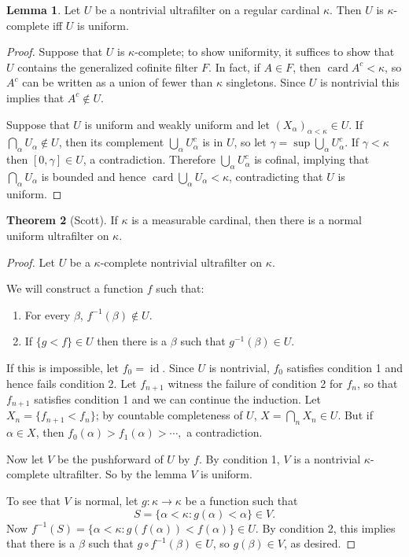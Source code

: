 \documentclass[12pt]{report}
\newcommand{\card}{\operatorname{card}}
\newcommand{\id}{\operatorname{id}}
\theoremstyle{definition}
\newtheorem{theorem}{Theorem}[chapter]
\newtheorem{lemma}[theorem]{Lemma}
\begin{document}
\begin{lemma}
Let $U$ be a nontrivial ultrafilter on a regular cardinal $\kappa$. Then $U$ is $\kappa$-complete iff $U$ is uniform.
\end{lemma}
\begin{proof}
Suppose that $U$ is $\kappa$-complete; to show uniformity, it suffices to show that $U$ contains the generalized cofinite filter $F$. In fact, if $A \in F$, then $\card A^c < \kappa$, so $A^c$ can be written as a union of fewer than $\kappa$ singletons. Since $U$ is nontrivial this implies that $A^c \notin U$.

Suppose that $U$ is uniform and weakly uniform and let $(X_\alpha)_{\alpha < \kappa} \in U$. If $\bigcap_\alpha U_\alpha \notin U$, then its complement $\bigcup_\alpha U_\alpha^c$ is in $U$, so let $\gamma = \sup \bigcup_\alpha U_\alpha^c$. If $\gamma < \kappa$ then $[0, \gamma] \in U$, a contradiction.
Therefore $\bigcup_\alpha U_\alpha^c$ is cofinal, implying that $\bigcap_\alpha U_\alpha$ is bounded and hence $\card \bigcup_\alpha U_\alpha < \kappa$, contradicting that $U$ is uniform.
\end{proof}

\begin{theorem}[Scott]
If $\kappa$ is a measurable cardinal, then there is a normal uniform ultrafilter on $\kappa$.
\end{theorem}
\begin{proof}
Let $U$ be a $\kappa$-complete nontrivial ultrafilter on $\kappa$.

We will construct a function $f$ such that:
\begin{enumerate}
\item For every $\beta$, $f^{-1}(\beta) \notin U$.
\item If $\{g < f\} \in U$ then there is a $\beta$ such that $g^{-1}(\beta) \in U$.
\end{enumerate}
If this is impossible, let $f_0 = \id$.
Since $U$ is nontrivial, $f_0$ satisfies condition 1 and hence fails condition 2. Let $f_{n+1}$ witness the failure of condition 2 for $f_n$, so that $f_{n+1}$ satisfies condition 1 and we can continue the induction.
Let $X_n = \{f_{n+1} < f_n\}$; by countable completeness of $U$, $X = \bigcap_n X_n \in U$. But if $\alpha \in X$, then $f_0(\alpha) > f_1(\alpha) > \cdots,$ a contradiction.

Now let $V$ be the pushforward of $U$ by $f$. By condition 1, $V$ is a nontrivial $\kappa$-complete ultrafilter. So by the lemma $V$ is uniform.

To see that $V$ is normal, let $g: \kappa \to \kappa$ be a function such that
$$S = \{\alpha < \kappa: g(\alpha) < \alpha\} \in V.$$
Now $f^{-1}(S) = \{\alpha < \kappa: g(f(\alpha)) < f(\alpha)\} \in U$. By condition 2, this implies that there is a $\beta$ such that $g \circ f^{-1}(\beta) \in U$, so $g(\beta) \in V$, as desired.
\end{proof}
\end{document}
